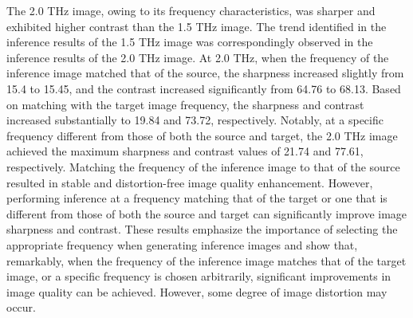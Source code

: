 The 2.0 THz image, owing to its frequency characteristics, was sharper and exhibited higher contrast than the 1.5 THz image. The trend identified in the inference results of the 1.5 THz image was correspondingly observed in the inference results of the 2.0 THz image.
At 2.0 THz, when the frequency of the inference image matched that of the source, the sharpness increased slightly from 15.4 to 15.45, and the contrast increased significantly from 64.76 to 68.13. Based on matching with the target image frequency, the sharpness and contrast increased substantially to 19.84 and 73.72, respectively. Notably, at a specific frequency different from those of both the source and target, the 2.0 THz image achieved the maximum sharpness and contrast values of 21.74 and 77.61, respectively. Matching the frequency of the inference image to that of the source resulted in stable and distortion-free image quality enhancement. However, performing inference at a frequency matching that of the target or one that is different from those of both the source and target can significantly improve image sharpness and contrast. These results emphasize the importance of selecting the appropriate frequency when generating inference images and show that, remarkably, when the frequency of the inference image matches that of the target image, or a specific frequency is chosen arbitrarily, significant improvements in image quality can be achieved. However, some degree of image distortion may occur.


